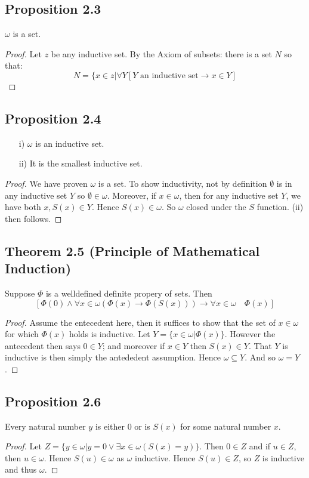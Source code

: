 \documentclass[a4paper, 12pt, twoside]{article}
\begin{document}
\subsection*{Proposition 2.3}
$\omega$ is a set.
\begin{proof}
    Let $z$ be any inductive set. By the Axiom of subsets: there is a set $N$ so that:
    $$N=\{x\in z|\forall Y[Y \text{ an inductive set}\to x\in Y] $$
\end{proof}
\subsection*{Proposition 2.4}
\begin{itemize}
    \item[i)] $\omega$ is an inductive set.
    \item[ii)] It is the smallest inductive set.
\end{itemize}
\begin{proof}
    We have proven $\omega$ is a set. To show inductivity, not by definition $\emptyset$ is in any inductive set $Y$ so $\emptyset\in\omega$. Moreover, if $x\in\omega$, then for any inductive set $Y$, we have both $x,S(x)\in Y$. Hence $S(x)\in\omega$. So $\omega$ closed under the $S$ function. (ii) then follows.
\end{proof}
\subsection*{Theorem 2.5 (Principle of Mathematical Induction)}
Suppose $\Phi$ is a welldefined definite propery of sets. Then
$$[\Phi(0)\wedge\forall x\in\omega(\Phi(x)\to\Phi(S(x)))\to\forall x\in \omega\quad\Phi(x)] $$
\begin{proof}
    Assume the entecedent here, then it suffices to show that the set of $x\in\omega$ for which $\Phi(x)$ holds is inductive. Let $Y=\{x\in\omega|\Phi(x)\}$. However the antecedent then says $0\in Y$; and moreover if $x\in Y$ then $S(x)\in Y$. That $Y$ is inductive is then simply the antededent assumption. Hence $\omega\subseteq Y$. And so $\omega = Y$.
\end{proof}
\subsection*{Proposition 2.6}
Every natural number $y$ is either $0$ or is $S(x)$ for some natural number $x$.
\begin{proof}
    Let $Z=\{y\in\omega|y=0\vee\exists x\in\omega(S(x)=y)\}$. Then $0\in Z$ and if $u\in Z$, then $u\in \omega$. Hence $S(u)\in\omega$ as $\omega$ inductive. Hence $S(u)\in Z$, so $Z$ is inductive and thus $\omega$.
\end{proof}
\end{document}
